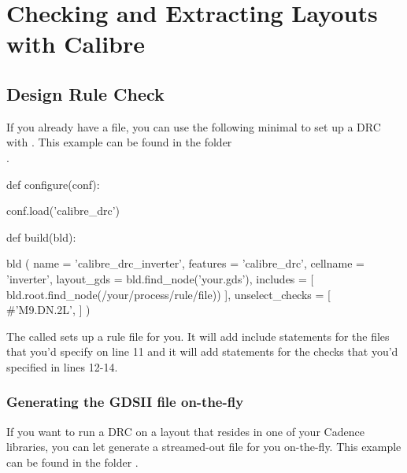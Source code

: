 \section{Checking and Extracting Layouts with Calibre}
\subsection{Design Rule Check}
If you already have a  file, you can use the following minimal
 to set up a \gls{DRC} with .
This example can be found in the folder\\
.
\begin{lstwscript}
def configure(conf):

    conf.load('calibre_drc')

def build(bld):

    bld (
        name = 'calibre_drc_inverter',
        features = 'calibre_drc',
        cellname = 'inverter',
        layout_gds = bld.find_node('your.gds'),
        includes = [
            bld.root.find_node(/your/process/rule/file))
        ],
        unselect_checks = [
            #'M9.DN.2L',
        ]
    )

\end{lstwscript}

The  called  sets up a rule file
for you. It will add include statements for the files that you'd specify
on line 11 and it will add  statements for the checks that
you'd specified in lines 12-14.

\subsubsection{Generating the GDSII file on-the-fly}
If you want to run a \gls{DRC} on a layout that resides in one of your Cadence
libraries, you can let  generate a streamed-out  file for
you on-the-fly.
This example can be found in the folder
.


